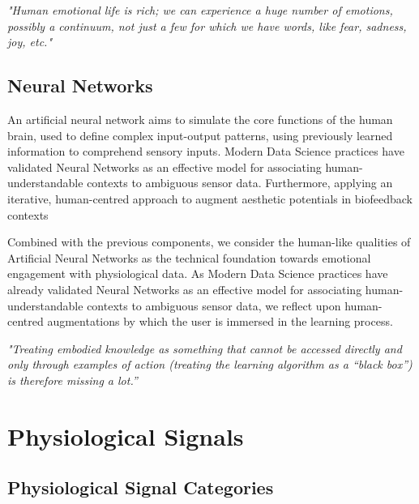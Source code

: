 \textit{"Human emotional life is rich; we can experience a huge number of emotions, possibly a continuum, not just a few for which we have words, like fear, sadness, joy, etc."}

 \cite{perlovsky_aesthetic_2014}


\subsection{Neural Networks}

An artificial neural network aims to simulate the core functions of the human brain, used to define complex input-output patterns, using previously learned information to comprehend sensory inputs. Modern Data Science practices have validated Neural Networks as an effective model for associating human-understandable contexts to ambiguous sensor data. Furthermore, applying an iterative, human-centred approach to augment aesthetic potentials in biofeedback contexts

Combined with the previous components, we consider the human-like qualities of Artificial Neural Networks as the technical foundation towards emotional engagement with physiological data. As Modern Data Science practices have already validated Neural Networks as an effective model for associating human-understandable contexts to ambiguous sensor data, we reflect upon human-centred augmentations by which the user is immersed in the learning process.

\textit{"Treating embodied knowledge as something that cannot be accessed directly and only through examples of action (treating the learning algorithm as a “black box”) is therefore missing a lot.” }

 \cite{gillies_understanding_2019}


\section{Physiological Signals}

\subsection{Physiological Signal Categories}
\label{subsec:catagories}

